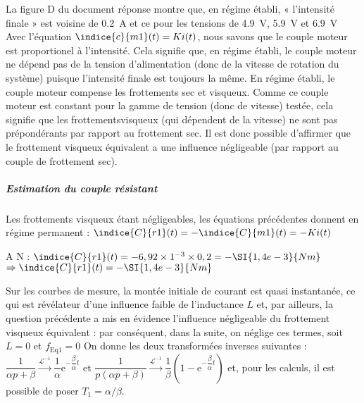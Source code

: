 \ifprof
\begin{corrige}
La figure D du document réponse montre que, en régime établi, « l’intensité finale » est voisine de \SI{0,2}{A} et ce pour les tensions de \SI{4,9}{V}, \SI{5,9}{V} et \SI{6,9}{V}
Avec l’équation $\indice{c}{m1}  (t)=K  i(t)$, nous savons que le couple moteur est proportionel à l’intensité. Cela signifie que, en régime établi, le couple moteur ne dépend pas de la tension d’alimentation (donc de la vitesse de rotation du système) puisque l’intensité finale est toujours la même.
En régime établi, le couple moteur compense les frottements sec et visqueux. Comme ce couple moteur est constant pour la gamme de tension (donc de vitesse) testée, cela signifie que les frottementsvisqueux (qui dépendent de la vitesse) ne sont pas prépondérants par rapport au frottement sec.
Il est donc possible d’affirmer que le frottement visqueux équivalent a une influence négligeable (par rapport au couple de frottement sec).
\subparagraph*{Estimation du couple résistant}
Les frottements visqueux étant négligeables, les équations précédentes donnent en régime permanent :
$\indice{C}{r1}(t)=-\indice{C}{m1}(t)=-K i(t)$ 

A N :  $\indice{C}{r1}(t)=-6,92\times 1^{-3} \times  0,2 = -\SI{1,4e-3}{Nm}$ $\Rightarrow   
\indice{C}{r1} (t)=-\SI{1,4 e-3}{Nm}$  

\end{corrige}
\else
\fi

\ifprof
\else
Sur les courbes de mesure, la montée initiale de courant est quasi instantanée, ce qui est révélateur d'une influence faible de l'inductance $L$ et, par ailleurs, la question précédente a mis en évidence l'influence négligeable du frottement visqueux équivalent : par conséquent, dans la suite, on néglige ces termes, soit $L=0$ et $f_{\mathrm{Eq} 1}=0$ On donne les deux transformées inverses suivantes : $\dfrac{1}{\alpha p+\beta} \xrightarrow{\mathcal{L}^{-1}} \dfrac{1}{\alpha} \mathrm{e}^{-\dfrac{\beta}{\alpha} t}$ et $\dfrac{1}{p(\alpha p+\beta)} \xrightarrow{\mathcal{L}^{-1}} \dfrac{1}{\beta}\left(1-\mathrm{e}^{-\dfrac{\beta}{\alpha} t}\right)$ et, pour les calculs, il est possible de poser $T_{1}=\alpha / \beta$.
\fi

